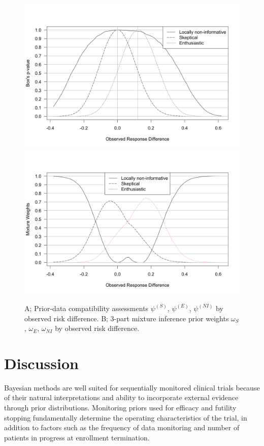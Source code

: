 \documentclass[useAMS,usenatbib,referee]{biom}
\begin{document}
\begin{figure}\begin{center}
\includegraphics[width=6in]{3-part-compatibility-1.png}
\includegraphics[width=6in]{3-part-compatibility-2.png}
    \caption{A; Prior-data compatibility assessments $\psi^{(S)}$, $\psi^{(E)}$, $\psi^{(NI)}$ by observed risk difference. B; 3-part mixture inference prior weights $\omega_S$, $\omega_{E}$, $\omega_{NI}$ by observed risk difference.}
\label{fig:3-part-compatibility}
 \end{center}
\end{figure}

\section{Discussion}
Bayesian methods are well suited for sequentially monitored clinical trials because of their natural interpretations and ability to incorporate external evidence through prior distributions. Monitoring priors used for efficacy and futility stopping fundamentally determine the operating characteristics of the trial, in addition to factors such as the frequency of data monitoring and number of patients in progress at enrollment termination. 
\end{document}
